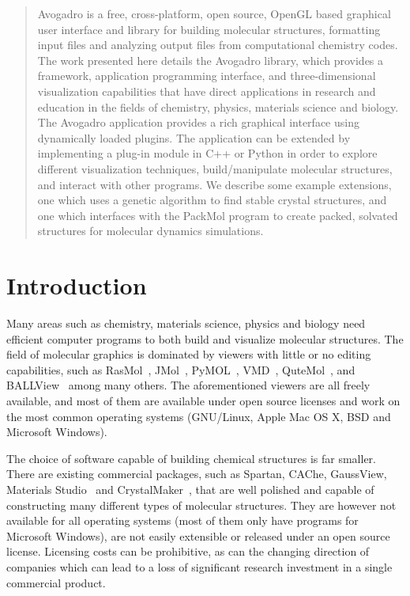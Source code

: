 \documentclass[10pt]{bmc_article}
\newenvironment{bmcformat}{\begin{raggedright}
\baselineskip20pt\sloppy\setboolean{publ}{false}}{\end{raggedright}
\baselineskip20pt\sloppy}
\begin{document}
\begin{bmcformat}
\begin{abstract}

Avogadro is a free, cross-platform, open source, OpenGL based graphical user
interface and library for building molecular structures, formatting input files
and analyzing output files from computational chemistry codes. The work
presented here details the Avogadro library, which provides a framework,
application programming interface, and three-dimensional visualization
capabilities that have direct applications in research and education in the
fields of chemistry, physics, materials science and biology. The Avogadro
application provides a rich graphical interface using dynamically loaded
plugins. The application can be extended by implementing a plug-in module in C++
or Python in order to explore different visualization techniques,
build/manipulate molecular structures, and interact with other programs.
We describe some example extensions, one which uses a genetic algorithm to find
stable crystal structures, and one which interfaces with the PackMol program to
create packed, solvated structures for molecular dynamics simulations.

\end{abstract}


\section{Introduction}

Many areas such as chemistry, materials science, physics and biology need
efficient computer programs to both build and visualize molecular structures.
The field of molecular graphics is dominated by viewers with little or no
editing capabilities, such as RasMol~\cite{RasMol}, JMol~\cite{JMol},
PyMOL~\cite{PyMOL}, VMD~\cite{VMD}, QuteMol~\cite{QuteMol}, and
BALLView~\cite{BALLView} among many others. The aforementioned viewers are all
freely available, and most of them are available under open source licenses and
work on the most common operating systems (GNU/Linux, Apple Mac OS X, BSD and
Microsoft Windows).

The choice of software capable of building chemical structures is far smaller.
There are existing commercial packages, such as Spartan, CAChe, GaussView,
Materials Studio~\cite{Accelrys} and CrystalMaker~\cite{CrystalMaker}, that are
well polished and capable of constructing many different types of molecular
structures. They are however not available for all operating systems (most of
them only have programs for Microsoft Windows), are not easily extensible or
released under an open source license. Licensing costs can be prohibitive, as
can the changing direction of companies which can lead to a loss of significant
research investment in a single commercial product.


\end{bmcformat}
\end{document}
